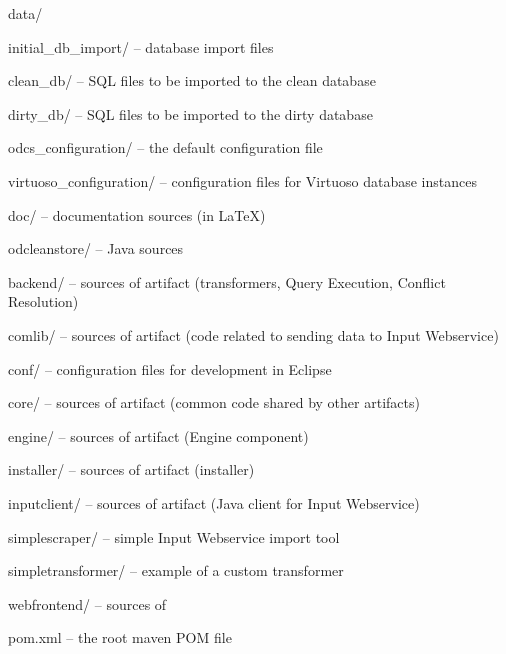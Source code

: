 \begin{dirlist}
	\item[data/] \mbox{}
		\begin{dirlist}
			\item[initial\_db\_import/] -- database import files
				\begin{dirlist}
					\item[clean\_db/] -- SQL files to be imported to the clean database
					\item[dirty\_db/] -- SQL files to be imported to the dirty database
				\end{dirlist}
			\item[odcs\_configuration/] -- the default \odcs configuration file
			\item[virtuoso\_configuration/] -- configuration files for Virtuoso database instances
		\end{dirlist}
	\item[doc/] -- documentation sources (in \LaTeX)
	\item[odcleanstore/] -- Java sources
		\begin{dirlist}
			\item[backend/] -- sources of  artifact (transformers, Query Execution, Conflict Resolution)
			\item[comlib/] -- sources of  artifact (code related to sending data to Input Webservice)
			\item[conf/] -- configuration files for development in Eclipse
			\item[core/] -- sources of  artifact (common code shared by other artifacts)
			\item[engine/]  -- sources of  artifact (Engine component)
			\item[installer/] -- sources of  artifact (\odcs installer)
			\item[inputclient/]  -- sources of  artifact (Java client for Input Webservice)
			\item[simplescraper/]  -- simple Input Webservice import tool
			\item[simpletransformer/]  -- example of a custom transformer
			\item[webfrontend/]  -- sources of \FE
			\item[pom.xml] -- the root maven POM file
		\end{dirlist}
\end{dirlist}


